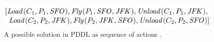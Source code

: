\documentclass{article}
\begin{document}
\begin{figure}[h]
	\centering
	\includegraphics[width=0.5\linewidth]{RN_PDDL-Solution.png}
	\caption{A possible solution in PDDL as sequence of actions \cite{russell_artificial_2010}.}
	\label{fig:PDDLSolution}
\end{figure}


%
%

\end{document}

